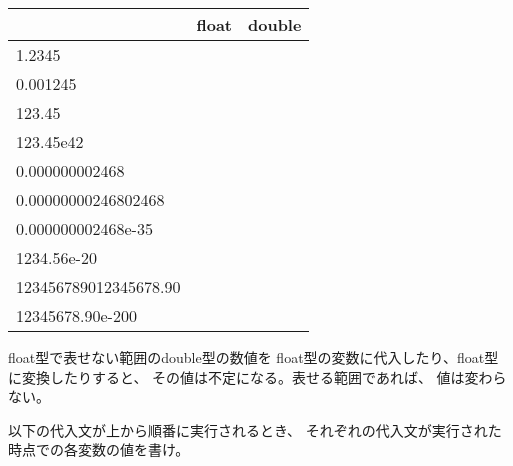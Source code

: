 \documentclass[12pt,a4j]{jarticle}
\newcounter{toi}
\def\toi{%
\bigskip\bigskip\noindent
\addtocounter{toi}{1}
\shadowbox{\bfseries\large 問\thetoi}
\nopagebreak[4]\bigskip\nopagebreak[4]
}
\begin{document}
\begin{multicols}{2}
 \begin{center}\ttfamily
 \begin{tabular}{|l|c|c|} \hline
 & \textrm{float} & \textrm{double} \\ \hline\hline
 1.2345 & & \\ \hline
 0.001245 & & \\ \hline
 123.45 & & \\ \hline
 123.45e42 & & \\ \hline
 0.000000002468 & & \\ \hline
 0.00000000246802468 & & \\ \hline
 0.000000002468e-35 & & \\ \hline
 1234.56e-20 & & \\ \hline
 123456789012345678.90 & & \\ \hline
 12345678.90e-200 & & \\ \hline
 \end{tabular}
 \end{center}
\end{multicols}







\toi
\begin{multicols}{2}
 
 float型で表せない範囲のdouble型の数値を
 float型の変数に代入したり、float型に変換したりすると、
 その値は不定になる。表せる範囲であれば、
 値は変わらない。

 以下の代入文が上から順番に実行されるとき、
 それぞれの代入文が実行された時点での各変数の値を書け。

 \vfill

 \begin{center}
 \end{center}
\end{multicols}
\end{document}
